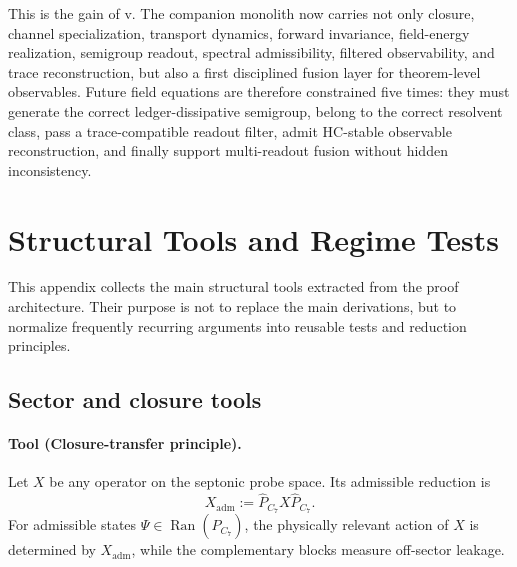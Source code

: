 This is the gain of v\docversion. The companion monolith now carries not only
closure, channel specialization, transport dynamics, forward invariance,
field-energy realization, semigroup readout, spectral admissibility, filtered
observability, and trace reconstruction, but also a first disciplined fusion
layer for theorem-level observables. Future field equations are therefore
constrained five times: they must generate the correct ledger-dissipative
semigroup, belong to the correct resolvent class, pass a trace-compatible readout
filter, admit HC-stable observable reconstruction, and finally support
multi-readout fusion without hidden inconsistency.



\section{Structural Tools and Regime Tests}
\label{app:structural-tools-regime-tests}

This appendix collects the main structural tools extracted from the
proof architecture. Their purpose is not to replace the main
derivations, but to normalize frequently recurring arguments into
reusable tests and reduction principles.

\subsection*{Sector and closure tools}

\paragraph{Tool (Closure-transfer principle).}
Let $X$ be any operator on the septonic probe space. Its admissible
reduction is
\[
  X_{\mathrm{adm}} := \hat{P}_{C_7} X \hat{P}_{C_7}.
\]
For admissible states $\Psi \in \operatorname{Ran}(\hat{P}_{C_7})$, the
physically relevant action of $X$ is determined by $X_{\mathrm{adm}}$,
while the complementary blocks measure off-sector leakage.

